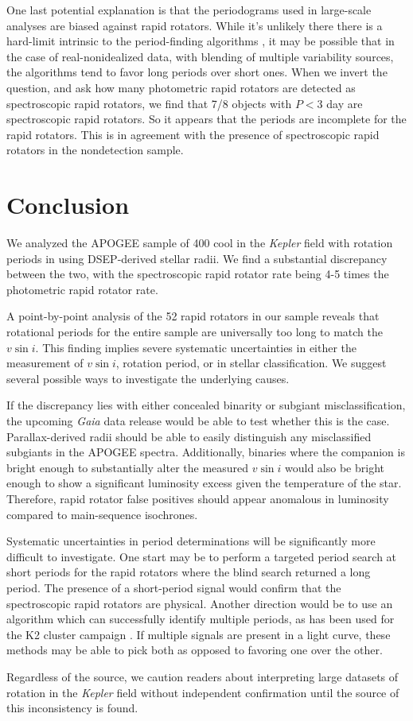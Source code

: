 \documentclass[manuscript]{aastex6}
\newcommand{\vsini}{\ensuremath{v \sin i}}
\newcommand{\Kepler}{\mbox{\textit{Kepler}}}
\newcommand{\Gaia}{\mbox{\textit{Gaia}}}
\begin{document}
One last potential explanation is that the periodograms used in large-scale
analyses are biased against rapid rotators. While it's unlikely there there is
a hard-limit intrinsic to the period-finding algorithms \citep{Aigrain15}, it
may be possible that in the case of real-nonidealized data, with blending of
multiple variability sources, the algorithms tend to favor long periods over
short ones. When we invert the question, and ask how many photometric rapid
rotators are detected as spectroscopic rapid rotators, we find that 7/8 objects
with \(P < 3\) day are spectroscopic rapid rotators. So it appears that the
\citet{McQuillan14} periods are incomplete for the rapid rotators. This is in
agreement with the presence of spectroscopic rapid rotators in the
\citet{McQuillan14} nondetection sample.

\section{Conclusion}
\label{sec:conclusions}

We analyzed the APOGEE sample of 400 cool in the \Kepler{} field with 
rotation periods in \citet{McQuillan14} using DSEP-derived stellar radii. We 
find a substantial discrepancy between the two, with the spectroscopic rapid
rotator rate being 4-5 times the photometric rapid rotator rate. 

A point-by-point analysis of the 52 rapid rotators in our sample reveals that
rotational periods for the entire sample are universally too long to match the 
\vsini{}. This finding implies severe systematic uncertainties in either the
measurement of \vsini{}, rotation period, or in stellar classification. We
suggest several possible ways to investigate the underlying causes.

If the discrepancy lies with either concealed binarity or subgiant
misclassification, the upcoming \Gaia{} data release would be able to
test whether this is the case. Parallax-derived radii should be able to
easily distinguish any misclassified subgiants in the APOGEE spectra.
Additionally, binaries where the companion is bright enough to
substantially alter the measured \vsini{} would also be bright enough to
show a significant luminosity excess given the temperature of the star.
Therefore, rapid rotator false positives should appear anomalous in
luminosity compared to main-sequence isochrones.

Systematic uncertainties in period determinations will be significantly more
difficult to investigate. One start may be to perform a targeted period search
at short periods for the rapid rotators where the blind search returned a long
period. The presence of a short-period signal would confirm that the
spectroscopic rapid rotators are physical. Another direction would be to use an
algorithm which can successfully identify multiple periods, as has been used
for the K2 cluster campaign \citep{Rebull16,Rebull17}. If multiple signals are
present in a light curve, these methods may be able to pick both as opposed to
favoring one over the other.

Regardless of the source, we caution readers about interpreting large
datasets of rotation in the \Kepler{} field without independent confirmation
until the source of this inconsistency is found.




\end{document}
